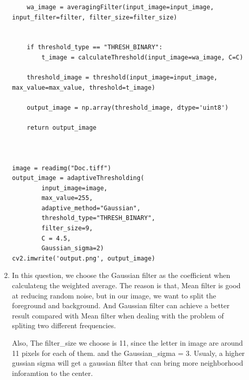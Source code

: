 \documentclass[12pt]{article}
\begin{document}
\begin{enumerate}[leftmargin=\labelsep]
\begin{enumerate}
\begin{lstlisting}
    wa_image = averagingFilter(input_image=input_image, input_filter=filter, filter_size=filter_size)


    if threshold_type == "THRESH_BINARY":
        t_image = calculateThreshold(input_image=wa_image, C=C)

    threshold_image = threshold(input_image=input_image, max_value=max_value, threshold=t_image)

    output_image = np.array(threshold_image, dtype='uint8')

    return output_image



image = readimg("Doc.tiff")
output_image = adaptiveThresholding(
        input_image=image, 
        max_value=255, 
        adaptive_method="Gaussian",         
        threshold_type="THRESH_BINARY", 
        filter_size=9, 
        C = 4.5, 
        Gaussian_sigma=2)
cv2.imwrite('output.png', output_image)
\end{lstlisting}

\item In this question, we choose the Gaussian filter as the coefficient when calculateng the weighted average. The reason is that, Mean filter is good at reducing random noise, but in our image, we want to split the foreground and background. And Gaussian filter can achieve a better result compared with Mean filter when dealing with the problem of spliting two different frequencies.

Also, The filter\_size we choose is 11, since the letter in image are around 11 pixels for each of them. and the Gaussian\_sigma = 3. Usualy, a higher gussian sigma will get a gaussian filter that can bring more neighborhood inforamtion to the center.


\end{enumerate}
\end{enumerate}
\end{document}
